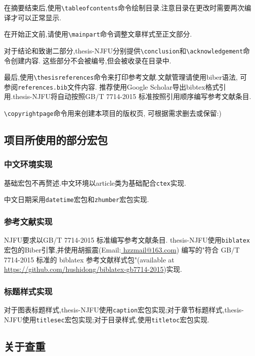 \documentclass[12pt]{thesis-NJFU}
\begin{document}
在摘要结束后,使用\verb|\tableofcontents|命令绘制目录.注意目录在更改时需要两次编译才可以正常显示.

在开始正文前,请使用\verb|\mainpart|命令调整文章样式至正文部分.

对于结论和致谢二部分,thesis-NJFU分别提供\verb|\conclusion|和\verb|\acknowledgement|命令创建内容.
这些部分不会被编号,但会被收录在目录中.

最后,使用\verb|\thesisreferences|命令来打印参考文献.文献管理请使用biber语法, 可参阅\verb|references.bib|文件内容.
推荐使用Google Scholar导出bibtex格式引用.thesis-NJFU将自动按照GB/T 7714-2015 标准按照引用顺序编写参考文献条目.

\verb|\copyrightpage|命令用来创建本项目的版权页, 可根据需求删去或保留:)

\subsection{项目所使用的部分宏包}

\subsubsection{中文环境实现}

基础宏包不再赘述.中文环境以article类为基础配合\verb|ctex|实现.

中文日期采用\verb|datetime|宏包和\verb|zhumber|宏包实现.

\subsubsection{参考文献实现}

NJFU要求以GB/T 7714-2015 标准编写参考文献条目.
thesis-NJFU使用\verb|biblatex|宏包的Biber引擎,并使用胡振震(Email:\url{ hzzmail@163.com})
编写的"符合 GB/T 7714-2015 标准的 biblatex 参考文献样式包"(available at \url{https://github.com/hushidong/biblatex-gb7714-2015})实现.

\subsubsection{标题样式实现}

对于图表标题样式,thesis-NJFU使用\verb|caption|宏包实现;对于章节标题样式,thesis-NJFU使用\verb|titlesec|宏包实现;对于目录样式,使用\verb|titletoc|宏包实现.

\subsection{关于查重}
\end{document}
